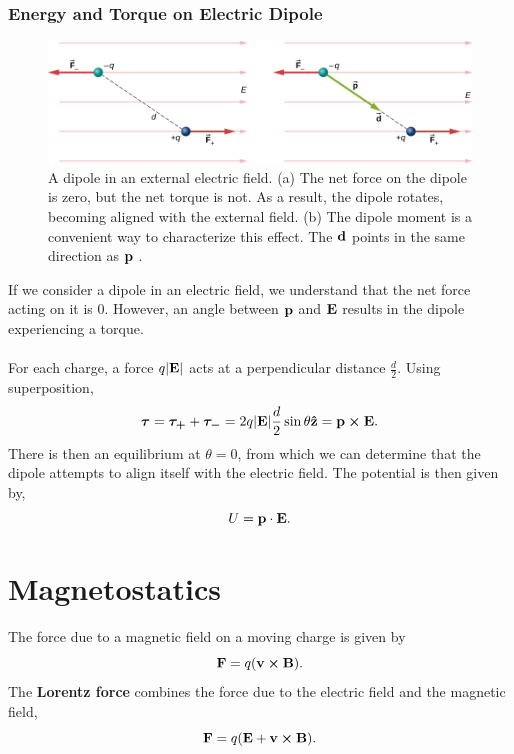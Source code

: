 \documentclass{book}
\begin{document}
\subsection{Energy and Torque on Electric Dipole}
\begin{figure}
    \centering
    \includegraphics[width=\textwidth]{CNX_UPhysics_22_07_DipoleRot.jpg}
    \caption{A dipole
in an external electric field. (a) The net force on the dipole
is zero, but the net torque is not. As a result, the dipole
rotates, becoming aligned with the external field. (b) The dipole moment
is a convenient way to characterize this effect. The $\vb{d}$ points in the same direction as $\vb{p}$ .}
    \label{fig:diprot}
\end{figure}
If we consider a dipole in an electric field, we understand that the net force acting on it is 0. However, an angle between $\vb{p}$ and $\vb{E}$ results in the dipole experiencing a torque. \\\\
For each charge, a force $q|\vb{E}|$ acts at a perpendicular distance $\frac{d}{2}$. Using superposition,
\begin{equation}
    \vb*{\tau} = \vb*{\tau_+} + \vb*{\tau_-} = 2q|\vb{E}|\frac{d}{2}\sin\theta \vu{z} = \vb{p}\cross \vb{E}.
\end{equation}
There is then an equilibrium at $\theta = 0$, from which we can determine that the dipole attempts to align itself with the electric field. The potential is then given by,
\begin{equation}
    U = \vb{p}\cdot \vb{E}.
\end{equation}

\chapter{Magnetostatics}
The force due to a magnetic field on a moving charge is given by
\begin{equation}
    \vb{F} = q(\vb{v}\cross\vb{B}). \label{bfieldforce}
\end{equation}
The \textbf{Lorentz force} combines the force due to the electric field and the magnetic field,
\begin{equation}
    \vb{F} = q(\vb{E} + \vb{v}\cross\vb{B}).
\end{equation}
\end{document}
